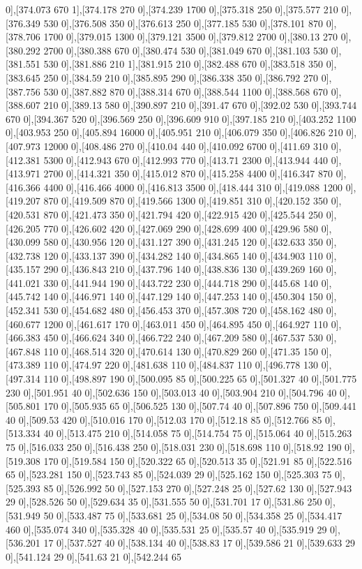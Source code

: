 {0],[374.073 670 1],[374.178 270 0],[374.239 1700 0],[375.318 250 0],[375.577 210 0],[376.349 530 0],[376.508 350 0],[376.613 250 0],[377.185 530 0],[378.101 870 0],[378.706 1700 0],[379.015 1300 0],[379.121 3500 0],[379.812 2700 0],[380.13 270 0],[380.292 2700 0],[380.388 670 0],[380.474 530 0],[381.049 670 0],[381.103 530 0],[381.551 530 0],[381.886 210 1],[381.915 210 0],[382.488 670 0],[383.518 350 0],[383.645 250 0],[384.59 210 0],[385.895 290 0],[386.338 350 0],[386.792 270 0],[387.756 530 0],[387.882 870 0],[388.314 670 0],[388.544 1100 0],[388.568 670 0],[388.607 210 0],[389.13 580 0],[390.897 210 0],[391.47 670 0],[392.02 530 0],[393.744 670 0],[394.367 520 0],[396.569 250 0],[396.609 910 0],[397.185 210 0],[403.252 1100 0],[403.953 250 0],[405.894 16000 0],[405.951 210 0],[406.079 350 0],[406.826 210 0],[407.973 12000 0],[408.486 270 0],[410.04 440 0],[410.092 6700 0],[411.69 310 0],[412.381 5300 0],[412.943 670 0],[412.993 770 0],[413.71 2300 0],[413.944 440 0],[413.971 2700 0],[414.321 350 0],[415.012 870 0],[415.258 4400 0],[416.347 870 0],[416.366 4400 0],[416.466 4000 0],[416.813 3500 0],[418.444 310 0],[419.088 1200 0],[419.207 870 0],[419.509 870 0],[419.566 1300 0],[419.851 310 0],[420.152 350 0],[420.531 870 0],[421.473 350 0],[421.794 420 0],[422.915 420 0],[425.544 250 0],[426.205 770 0],[426.602 420 0],[427.069 290 0],[428.699 400 0],[429.96 580 0],[430.099 580 0],[430.956 120 0],[431.127 390 0],[431.245 120 0],[432.633 350 0],[432.738 120 0],[433.137 390 0],[434.282 140 0],[434.865 140 0],[434.903 110 0],[435.157 290 0],[436.843 210 0],[437.796 140 0],[438.836 130 0],[439.269 160 0],[441.021 330 0],[441.944 190 0],[443.722 230 0],[444.718 290 0],[445.68 140 0],[445.742 140 0],[446.971 140 0],[447.129 140 0],[447.253 140 0],[450.304 150 0],[452.341 530 0],[454.682 480 0],[456.453 370 0],[457.308 720 0],[458.162 480 0],[460.677 1200 0],[461.617 170 0],[463.011 450 0],[464.895 450 0],[464.927 110 0],[466.383 450 0],[466.624 340 0],[466.722 240 0],[467.209 580 0],[467.537 530 0],[467.848 110 0],[468.514 320 0],[470.614 130 0],[470.829 260 0],[471.35 150 0],[473.389 110 0],[474.97 220 0],[481.638 110 0],[484.837 110 0],[496.778 130 0],[497.314 110 0],[498.897 190 0],[500.095 85 0],[500.225 65 0],[501.327 40 0],[501.775 230 0],[501.951 40 0],[502.636 150 0],[503.013 40 0],[503.904 210 0],[504.796 40 0],[505.801 170 0],[505.935 65 0],[506.525 130 0],[507.74 40 0],[507.896 750 0],[509.441 40 0],[509.53 420 0],[510.016 170 0],[512.03 170 0],[512.18 85 0],[512.766 85 0],[513.334 40 0],[513.475 210 0],[514.058 75 0],[514.754 75 0],[515.064 40 0],[515.263 75 0],[516.033 250 0],[516.438 250 0],[518.031 230 0],[518.698 110 0],[518.92 190 0],[519.308 170 0],[519.584 150 0],[520.322 65 0],[520.513 35 0],[521.91 85 0],[522.516 65 0],[523.281 150 0],[523.743 85 0],[524.039 29 0],[525.162 150 0],[525.303 75 0],[525.393 85 0],[526.992 50 0],[527.153 270 0],[527.248 25 0],[527.62 130 0],[527.943 29 0],[528.526 50 0],[529.634 35 0],[531.555 50 0],[531.701 17 0],[531.86 250 0],[531.949 50 0],[533.487 75 0],[533.681 25 0],[534.08 50 0],[534.358 25 0],[534.417 460 0],[535.074 340 0],[535.328 40 0],[535.531 25 0],[535.57 40 0],[535.919 29 0],[536.201 17 0],[537.527 40 0],[538.134 40 0],[538.83 17 0],[539.586 21 0],[539.633 29 0],[541.124 29 0],[541.63 21 0],[542.244 65 }
